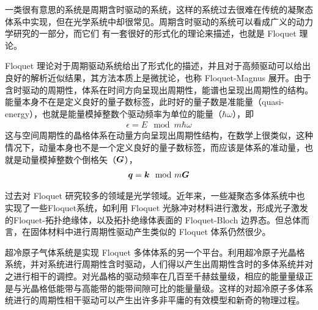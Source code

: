 一类很有意思的系统是周期含时驱动的系统，这样的系统过去很难在传统的凝聚态体系中实现，但在光学系统中却很常见。周期含时驱动的系统可以看成广义的动力学研究的一部分，而它们
有一套很好的形式化的理论来描述，也就是 Floquet 理论\cite{floquet2017}。

Floquet 理论对于周期驱动系统给出了形式化的描述，并且对于高频驱动可以给出良好的解析近似结果\cite{highfreq2015}，其方法本质上是微扰论，也称 Floquet-Magnus 展开\cite{floquet-magnus-2001}。由于含时驱动的周期性，体系在时间方向呈现出周期性，能谱也呈现出周期性的结构。能量本身不在是定义良好的量子数标签，此时好的量子数是准能量（quasi-energy），也就是能量模掉整数个驱动频率为单位的能量（$\hbar\omega$），即
\begin{align}
\epsilon = E \mod m\hbar\omega
\end{align}
这与空间周期性的晶格体系在动量方向呈现出周期性结构，在数学上很类似，这种情况下，动量本身也不是一个定义良好的量子数标签，而应该是体系的准动量，也就是动量模掉整数个倒格矢（$\boldsymbol{G}$），
\begin{align}
\boldsymbol{q} = \boldsymbol{k} \mod m \boldsymbol{G}
\end{align}

过去对 Floquet 研究较多的领域是光学领域\cite{shirley1965,sambe1973}。近年来，一些凝聚态多体系统中也实现了一些Floquet系统，如利用 Floquet 光脉冲对材料进行激发，形成光子激发的Floquet-拓扑绝缘体\cite{photon-floq-2013}，以及拓扑绝缘体表面的 Floquet-Bloch 边界态\cite{floq-bloch-2013}。但总体而言，在固体材料中进行周期性驱动产生类似的 Floquet 体系仍然很少。

超冷原子气体系统是实现 Floquet 多体体系的另一个平台。利用超冷原子光晶格系统，并对系统进行周期性含时驱动，人们得以产生出周期性含时的多体系统并对之进行相干的调控\cite{floquet2017}。对光晶格的驱动频率在几百至千赫兹量级，相应的能量量级正是与光晶格低能带与高能带的能带间隙可比的能量量级。这样的对超冷原子多体系统进行的周期性相干驱动可以产生出许多非平庸的有效模型和新奇的物理过程。

